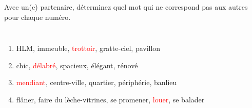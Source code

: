 \begin{frame}{}
  Avec un(e) partenaire, déterminez quel mot qui ne correspond pas aux autres pour chaque numéro.
  \begin{columns}
      \begin{enumerate}
        \item HLM, immeuble, \textcolor<2->{red}{trottoir}, gratte-ciel, pavillon
        \item chic, \textcolor<4->{red}{délabré}, spacieux, élégant, rénové
        \item \textcolor<6->{red}{mendiant}, centre-ville, quartier, périphérie, banlieu
        \item flâner, faire du lèche-vitrines, se promener, \textcolor<8->{red}{louer}, se balader
      \end{enumerate}
      \begin{minipage}[c][0.75\textheight]{\linewidth}
        \begin{center}
        \end{center}
      \end{minipage}
  \end{columns}
\end{frame}